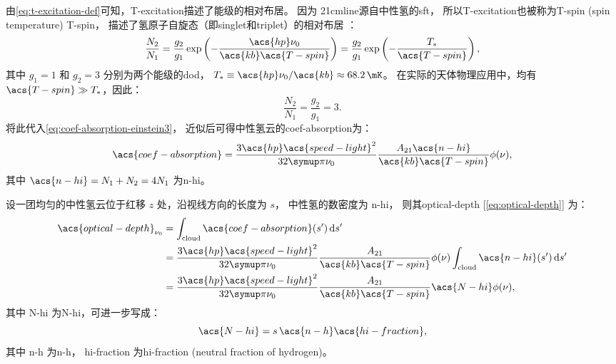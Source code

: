 由\autoref{eq:t-excitation-def}可知，\acl{T-excitation}描述了能级的相对布居。
因为 \ac{21cmline}源自中性氢的\ac{sft}，
所以\acl{T-excitation}也被称为\acl{T-spin} (spin temperature) \ac{T-spin}，
描述了氢原子自旋态（即\ac{singlet}和\ac{triplet}）的相对布居 \cite{field1958}：
\begin{equation}
  \frac{N_2}{N_1} = \frac{g_2}{g_1}
    \exp\left( -\frac{\acs{hp} \nu_0}{\acs{kb} \acs{T-spin}} \right)
    = \frac{g_2}{g_1} \exp\left( -\frac{T_*}{\acs{T-spin}} \right),
\end{equation}
其中
$g_1 = 1$ 和 $g_2 = 3$ 分别为两个能级的\ac{dod}，
$T_* \equiv \acs{hp} \nu_0 / \acs{kb} \approx \SI{68.2}{\mK}$。
在实际的天体物理应用中，均有 $\acs{T-spin} \gg T_*$，因此：
\begin{equation}
  \frac{N_2}{N_1} = \frac{g_2}{g_1} = 3 .
\end{equation}
将此代入\autoref{eq:coef-absorption-einstein3}，
近似后可得中性氢云的\acl{coef-absorption}为：
\begin{equation}
  \acs{coef-absorption}
    = \frac{3 \acs{hp} \acs{speed-light}^2}{32\Cpi \nu_0}
      \frac{A_{21} \acs{n-hi}}{\acs{kb} \acs{T-spin}} \phi(\nu) ,
\end{equation}
其中 $\acs{n-hi} = N_1 + N_2 = 4 N_1$ 为\acl{n-hi}。

设一团均匀的中性氢云位于红移 $z$ 处，沿视线方向的长度为 $s$，
中性氢的数密度为 \ac{n-hi}，
则其\acl{optical-depth} [\autoref{eq:optical-depth}] 为：
\begin{align}
  \acs{optical-depth}_{\nu_0}
    & = \int_{\R{cloud}} \acs{coef-absorption}(s') \,\D{s'}  \\
    & = \frac{3 \acs{hp} \acs{speed-light}^2}{32\Cpi \nu_0}
      \frac{A_{21}}{\acs{kb} \acs{T-spin}} \phi(\nu)
      \int_{\R{cloud}} \acs{n-hi}(s') \,\D{s'}  \\
    & = \frac{3 \acs{hp} \acs{speed-light}^2}{32\Cpi \nu_0}
      \frac{A_{21}}{\acs{kb} \acs{T-spin}} \acs{N-hi} \phi(\nu) ,
  \label{eq:21cm-optical-depth1}
\end{align}
其中 \acs{N-hi} 为\acl{N-hi}，可进一步写成：
\begin{equation}
  \label{eq:column-density}
  \acs{N-hi} = s \, \acs{n-h} \acs{hi-fraction} ,
\end{equation}
其中
\acs{n-h} 为\acl{n-h}，
\acs{hi-fraction} 为\acl{hi-fraction} (neutral fraction of hydrogen)。

